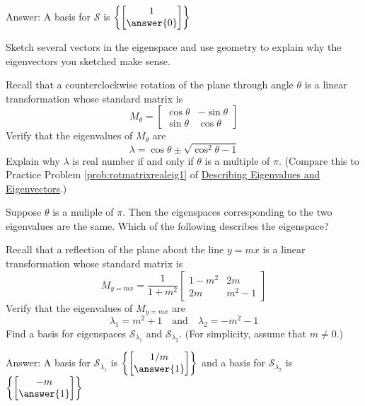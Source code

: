 \documentclass{ximera}
\begin{document}
\begin{problem}
\begin{problem}
Answer:  A basis for $\mathcal{S}$ is $\left\{\begin{bmatrix}1\\\answer{0}\end{bmatrix}\right\}$

Sketch several vectors in the eigenspace and use geometry to explain why the eigenvectors you sketched make sense.
\end{problem}

\begin{problem}\label{prob:rotmatrixrealeig2}
Recall that a counterclockwise rotation of the plane through angle $\theta$ is a linear transformation whose standard matrix is $$M_{\theta}=\begin{bmatrix}\cos\theta&-\sin\theta\\\sin\theta&\cos\theta\end{bmatrix}$$
Verify that the eigenvalues of $M_{\theta}$ are
$$\lambda=\cos\theta\pm\sqrt{\cos^2\theta-1}$$
Explain why $\lambda$ is real number if and only if $\theta$ is a multiple of $\pi$.  (Compare this to Practice Problem \ref{prob:rotmatrixrealeig1} of \href{https://ximera.osu.edu/oerlinalg/LinearAlgebra/EIG-0010/main}{Describing Eigenvalues and Eigenvectors}.)

Suppose $\theta$ is a muliple of $\pi$.  Then the eigenspaces corresponding to the two eigenvalues are the same.  Which of the following describes the eigenspace?
\begin{multipleChoice}
\end{multipleChoice}

\end{problem}

\begin{problem}\label{prob:eigvectorstransfr2_3}
Recall that a reflection of the plane about the line $y=mx$ is a linear transformation whose standard matrix is
$$M_{y=mx}=\frac{1}{1+m^2}\begin{bmatrix}
1-m^2 & 2m \\
2m & m^2-1
\end{bmatrix}$$
Verify that the eigenvalues of $M_{y=mx}$ are
$$\lambda_1=m^2+1\quad\text{and}\quad\lambda_2=-m^2-1$$
Find a basis for eigenspaces $\mathcal{S}_{\lambda_1}$ and $\mathcal{S}_{\lambda_2}$.  (For simplicity, assume that $m\neq 0$.)

Answer:  A basis for $\mathcal{S}_{\lambda_1}$ is $\left\{\begin{bmatrix}1/m\\\answer{1}\end{bmatrix}\right\}$
and a basis for $\mathcal{S}_{\lambda_2}$ is $\left\{\begin{bmatrix}-m\\\answer{1}\end{bmatrix}\right\}$


\end{problem}
\end{problem}
\end{document}
